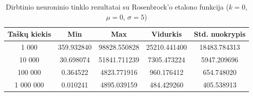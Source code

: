 \begin{table}[H]
    \centering
    \begin{tabular}{|c|c|c|c|c|}
        \hline
        \textbf{Taškų kiekis} & \textbf{Min} & \textbf{Max} & \textbf{Vidurkis} & \textbf{Std. nuokrypis} \\ \hline
        1 000        & 359.932840 & 98828.550828 & 25210.441400 & 18483.784313 \\ \hline
        10 000       & 30.698074 & 51841.711239 & 7305.473224 & 5947.209696 \\ \hline
        100 000      & 0.364522 & 4823.771916 & 960.176412 & 654.748020 \\ \hline
        1 000 000    & 0.010241 & 4895.039159 & 484.429260 & 405.538913 \\ \hline
    \end{tabular}
    \caption{Dirbtinio neuroninio tinklo rezultatai su Rosenbrock'o etalono funkcija ($k = 0$, $\mu = 0$, $\sigma = 5$)}
\end{table}
